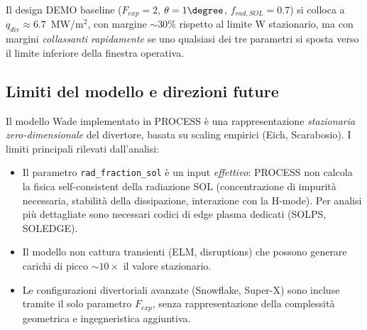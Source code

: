 Il design DEMO baseline ($F_{exp} = 2$, $\theta = 1\degree$,
$f_{rad,SOL} = 0.7$) si colloca a $q_{div} \approx 6.7$~MW/m$^2$, con
margine $\sim 30\%$ rispetto al limite W stazionario, ma con margini
\emph{collassanti rapidamente} se uno qualsiasi dei tre parametri si
sposta verso il limite inferiore della finestra operativa.

\subsection{Limiti del modello e direzioni future}

Il modello Wade implementato in PROCESS è una rappresentazione
\emph{stazionaria zero-dimensionale} del divertore, basata su scaling
empirici (Eich, Scarabosio). I limiti principali rilevati dall'analisi:

\begin{itemize}
    \item Il parametro \verb|rad_fraction_sol| è un input \emph{effettivo}:
          PROCESS non calcola la fisica self-consistent della radiazione SOL
          (concentrazione di impurità necessaria, stabilità della
          dissipazione, interazione con la H-mode). Per analisi più
          dettagliate sono necessari codici di edge plasma dedicati
          (SOLPS, SOLEDGE).
    \item Il modello non cattura transienti (ELM, disruptions) che possono
          generare carichi di picco $\sim 10\times$ il valore stazionario.
    \item Le configurazioni divertoriali avanzate (Snowflake, Super-X)
          sono incluse tramite il solo parametro $F_{exp}$, senza
          rappresentazione della complessità geometrica e ingegneristica
          aggiuntiva.
\end{itemize}

